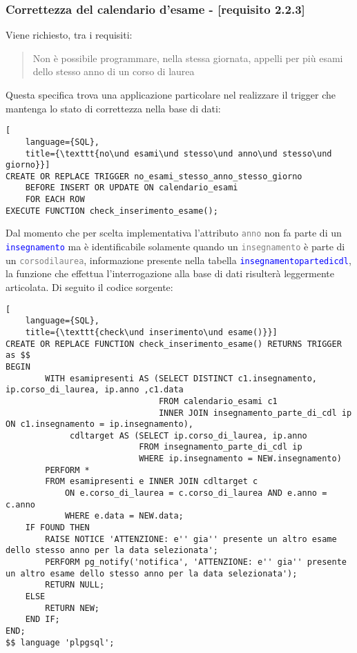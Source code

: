 \documentclass{article}
\newcommand{\tabb}[1]{\texttt{\textcolor{blue}{#1}}}
\newcommand{\attr}[1]{\texttt{\textcolor{gray}{#1}}}
\newcommand{\und}[0]{\textunderscore}
\begin{document}
\subsubsection{Correttezza del calendario d'esame - [requisito 2.2.3]}
Viene richiesto, tra i requisiti:
\begin{quote}
    Non è possibile programmare, nella stessa giornata, appelli per più esami dello stesso anno di un corso di laurea
\end{quote}
Questa specifica trova una applicazione particolare nel realizzare il trigger che mantenga lo stato di correttezza nella base di dati:
\begin{lstlisting}[
    language={SQL},
    title={\texttt{no\und esami\und stesso\und anno\und stesso\und giorno}}]
CREATE OR REPLACE TRIGGER no_esami_stesso_anno_stesso_giorno
    BEFORE INSERT OR UPDATE ON calendario_esami
    FOR EACH ROW
EXECUTE FUNCTION check_inserimento_esame();

\end{lstlisting}
Dal momento che per scelta implementativa l'attributo \attr{anno} non fa parte di un \tabb{insegnamento} ma è identificabile solamente quando un \attr{insegnamento} è parte di un \attr{corso\und di\und laurea}, informazione presente nella tabella \tabb{insegnamento\und parte\und di\und cdl}, la funzione che effettua l'interrogazione alla base di dati risulterà leggermente articolata. Di seguito il codice sorgente:
\begin{lstlisting}[
    language={SQL},
    title={\texttt{check\und inserimento\und esame()}}]
CREATE OR REPLACE FUNCTION check_inserimento_esame() RETURNS TRIGGER as $$
BEGIN
        WITH esamipresenti AS (SELECT DISTINCT c1.insegnamento, ip.corso_di_laurea, ip.anno ,c1.data
                               FROM calendario_esami c1
                               INNER JOIN insegnamento_parte_di_cdl ip ON c1.insegnamento = ip.insegnamento),
             cdltarget AS (SELECT ip.corso_di_laurea, ip.anno
                           FROM insegnamento_parte_di_cdl ip
                           WHERE ip.insegnamento = NEW.insegnamento)
        PERFORM *
        FROM esamipresenti e INNER JOIN cdltarget c
            ON e.corso_di_laurea = c.corso_di_laurea AND e.anno = c.anno
            WHERE e.data = NEW.data;
    IF FOUND THEN
        RAISE NOTICE 'ATTENZIONE: e'' gia'' presente un altro esame dello stesso anno per la data selezionata';
        PERFORM pg_notify('notifica', 'ATTENZIONE: e'' gia'' presente un altro esame dello stesso anno per la data selezionata');
        RETURN NULL;
    ELSE
        RETURN NEW;
    END IF;
END;
$$ language 'plpgsql';
\end{lstlisting}
\end{document}
